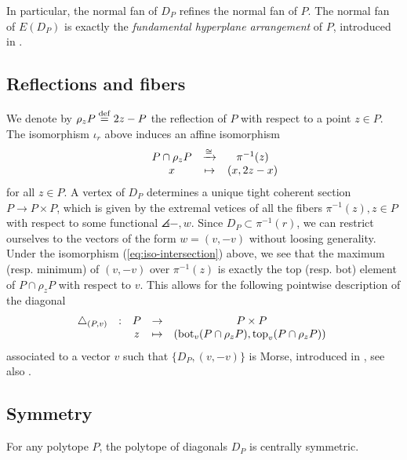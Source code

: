 In particular, the normal fan of $D_P$ refines the normal fan of $P$.
The normal fan of $E(D_P)$ is exactly the \emph{fundamental hyperplane arrangement} of $P$, introduced in \cite[Definition 1.18]{GLA21}.


\subsection{Reflections and fibers}

We denote by $\rho_z P \stackrel{\mathrm{def}}{=} 2z-P$ the reflection of $P$ with respect to a point $z \in P$.
The isomorphism $\iota_r$ above induces an affine isomorphism
\begin{equation}
\label{eq:iso-intersection}
	\begin{matrix}
		& & P \cap \rho_z P & \xrightarrow{\cong} & \pi^{-1}(z) \\
		& & x & \mapsto & (x,2z-x)
	\end{matrix}
\end{equation}
for all $z \in P$.
A vertex of $D_P$ determines a unique tight coherent section $P \to P \times P$, which is given by the extremal vetices of all the fibers $\pi^{-1}(z), z \in P$ with respect to some functional $\angles{-,w}$.
Since $D_P \subset \pi^{-1}(r)$, we can restrict ourselves to the vectors of the form $w=(v,-v)$ without loosing generality.
Under the isomorphism (\ref{eq:iso-intersection}) above, we see that the maximum (resp. minimum) of $(v,-v)$ over $\pi^{-1}(z)$ is exactly the top (resp. bot) element of $P\cap \rho_z P$ with respect to $v$.
This allows for the following pointwise description of the diagonal
\begin{equation*}
	\begin{matrix}
		\triangle_{(P,v)} & : & P & \to & P \times P \\
		& & z & \mapsto & (\operatorname{bot}_v(P \cap \rho_z P),\operatorname{top}_v(P \cap \rho_z P)) \
	\end{matrix}
\end{equation*}
associated to a vector $v$ such that $\{D_P, (v,-v)\}$ is Morse, introduced in \cite[Definition 10]{MTTV19}, see also \cite[Proposition 1.15]{GLA21}.


\subsection{Symmetry}

\begin{lemma}
	For any polytope $P$, the polytope of diagonals $D_P$ is centrally symmetric.
\end{lemma}


